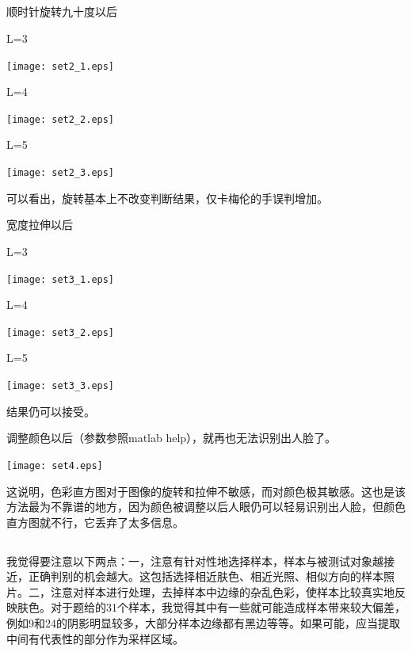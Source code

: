 \documentclass{article}
\begin{document}
\subsection{}
\noindent{}
\par 顺时针旋转九十度以后
\par L=3
\begin{center}\texttt{[image: set2\_1.eps]}\end{center}
\par L=4
\begin{center}\texttt{[image: set2\_2.eps]}\end{center}
\par L=5
\begin{center}\texttt{[image: set2\_3.eps]}\end{center}
\par 可以看出，旋转基本上不改变判断结果，仅卡梅伦的手误判增加。
\par 宽度拉伸以后
\par L=3
\begin{center}\texttt{[image: set3\_1.eps]}\end{center}
\par L=4
\begin{center}\texttt{[image: set3\_2.eps]}\end{center}
\par L=5
\begin{center}\texttt{[image: set3\_3.eps]}\end{center}
\par 结果仍可以接受。
\par 调整颜色以后（参数参照matlab help），就再也无法识别出人脸了。
\begin{center}\texttt{[image: set4.eps]}\end{center}
\par 这说明，色彩直方图对于图像的旋转和拉伸不敏感，而对颜色极其敏感。这也是该方法最为不靠谱的地方，因为颜色被调整以后人眼仍可以轻易识别出人脸，但颜色直方图就不行，它丢弃了太多信息。

\subsection{}
\noindent{}
\par 我觉得要注意以下两点：一，注意有针对性地选择样本，样本与被测试对象越接近，正确判别的机会越大。这包括选择相近肤色、相近光照、相似方向的样本照片。二，注意对样本进行处理，去掉样本中边缘的杂乱色彩，使样本比较真实地反映肤色。对于题给的31个样本，我觉得其中有一些就可能造成样本带来较大偏差，例如9和24的阴影明显较多，大部分样本边缘都有黑边等等。如果可能，应当提取中间有代表性的部分作为采样区域。
\end{document}
